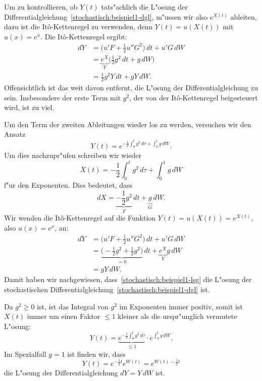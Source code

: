 Um zu kontrollieren, ob $Y(t)$ tats"achlich die L"osung der
Differentialgleichung~\eqref{stochastisch:beispiel1-dgl}, m"ussen wir
also $e^{X(t)}$ ableiten, dazu ist die It\^o-Kettenregel zu verwenden,
denn $Y(t)=u(X(t))$ mit $u(x)=e^x$.
Die It\^o-Kettenregel ergibt:
\begin{align*}
dY
&=
\biggl( u'F+\frac12u''G^2 \biggr)\,dt + u' G\,dW
\\
&=
\underbrace{e^X}_{\textstyle Y}\biggl(\frac12g^2\,dt + g\,dW\biggr)
\\
&=
\frac12g^2Y\,dt + gY\,dW.
\end{align*}
Offensichtlich ist das weit davon entfernt, die L"osung der
Differentialgleichung zu sein.
Insbesondere der erste Term mit $g^2$, der von der It\^o-Kettenregel
beigesteuert wird, ist zu viel.

Um den Term der zweiten Ableitungen wieder los zu werden, versuchen wir
den Ansatz
\begin{equation}
Y(t) = e^{-\frac12\int_0^tg^2\,d\tau+\int_0^t g\,dW}.
\label{stochastisch:beispiel1-lsg}
\end{equation}
Um dies nachzupr"ufen schreiben wir wieder 
\[
X(t)
=
-\frac12\int_0^tg^2\,d\tau+\int_0^t g\,dW
\]
f"ur den Exponenten.
Dies bedeutet, dass
\[
dX
=
\underbrace{-\frac12g^2}_{\textstyle F}\,dt
+
\underbrace{g}_{\textstyle G}\,dW.
\]
Wir wenden die It\^o-Kettenregel auf die Funktion
$Y(t)=u(X(t))=e^{X(t)}$, also $u(x)=e^x$, an:
\begin{align*}
dY
&=
\biggl( u'F + \frac12u''G^2\biggr)\,dt + u'G\,dW
\\
&=
\underbrace{\biggl(-\frac12 g^2 + \frac12 g^2\biggr)}_{\textstyle=0}\,dt
+
\underbrace{e^X}_{\textstyle Y}g\,dW
\\
&=gY\,dW.
\end{align*}
Damit haben wir nachgewiesen, dass~\eqref{stochastisch:beispiel1-lsg}
die L"osung der stochastischen
Differentialgleichung~\eqref{stochastisch:beispiel1-dgl} ist.

Da $g^2\ge 0$ ist, ist das Integral von $g^2$ im Exponenten
immer positiv, somit ist $X(t)$ immer um einen Faktor $\le1$ 
kleiner als die urspr"unglich vermutete L"osung:
\[
Y(t)
=
\underbrace{e^{-\frac12 \int_0^tg^2\,d\tau}}_{\textstyle \le 1}
\cdot e^{\int_0^tg\,dW}.
\]
Im Spezialfall $g=1$ ist finden wir, dass
\[
Y(t)=e^{-\frac12t}e^{W(t)}=e^{W(t)-\frac12t}
\]
die L"osung der Differentialgleichung $dY=Y\,dW$ ist.

